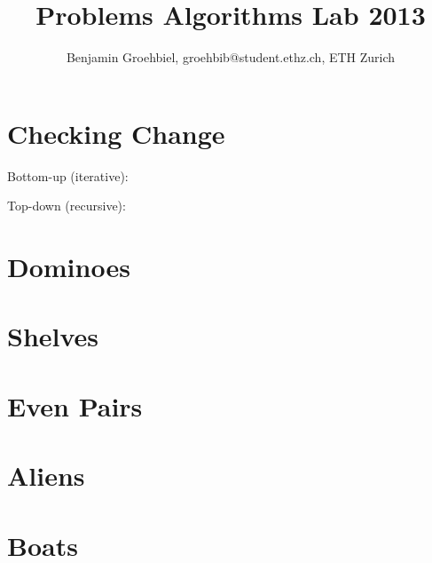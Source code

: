 \documentclass[a4paper, 10pt]{article}
\title{Problems Algorithms Lab 2013}
\author{Benjamin Groehbiel, groehbib@student.ethz.ch, ETH Zurich}
\let\stdsection\section
\renewcommand\section{\newpage\stdsection}
\newcommand{\includecode}[1]{
    }
\begin{document}
    
    \maketitle
    \newpage
    
    \begin{multicols}{2}
        \renewcommand{\cftsecleader}{\cftdotfill{\cftdotsep}}
        \renewcommand*\contentsname{Problems}
        \setcounter{tocdepth}{1}    %
        \tableofcontents
    \end{multicols}
    
    \printindex
    
    
    \section{Checking Change}
        Bottom-up (iterative):
        \includecode{../problems/w01/Checking_Change/CheckingChange1.cpp}
        Top-down (recursive):
        \includecode{../problems/w01/Checking_Change/CheckingChangeRecursive1.cpp}
        
    \section{Dominoes}
        \includecode{../problems/w01/Dominoes/Dominoes1.cpp}
    
    \section{Shelves}
        \includecode{../problems/w01/Shelves/Shelves1.cpp}
        
    \section{Even Pairs}
        \includecode{../problems/w01/Even_Pairs/EvenPairs1.cpp}
    
    
    \section{Aliens}
        \includecode{../problems/w02/Aliens/Aliens1.cpp}
        
    \section{Boats}
        \includecode{../problems/w02/Boats/Boats1.cpp}
        
\end{document}
